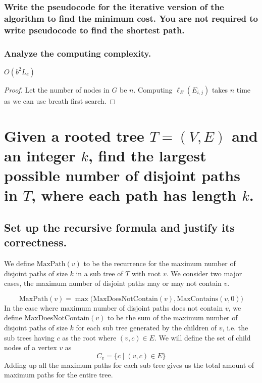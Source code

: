 \documentclass[11pt]{scrartcl}
\newcommand{\maxp}{\text{MaxPath}}
\newcommand{\ctn}{\text{MaxContains}}
\newcommand{\dctn}{\text{MaxDoesNotContain}}
\begin{document}
\subsubsection{
	Write the pseudocode for the iterative version of the algorithm to find the minimum
	cost. You are not required to write pseudocode to find the shortest path.
}
\begin{algorithm}
\end{algorithm}



\subsubsection{
	Analyze the computing complexity.
}
$O(b^2L_e)$
\begin{proof}
	Let the number of nodes in $G$ be $n$.
	Computing $\ell_E(E_{i,j})$ takes $n$ time as we can use breath first search.  
\end{proof}



\section{
  Given a	rooted tree $T = (V, E)$ and an integer $k$, find the largest possible
  number of disjoint paths in $T$, where each path has length $k$.
 }
\subsection{
	Set up the recursive formula and justify its correctness.
}
We define $\maxp(v)$ to be the recurrence for the maximum number of disjoint paths of size $k$ in a sub tree
of $T$ with root $v$. We consider two major cases, the maximum number of disjoint paths may or
may not contain $v$.

$$
	\maxp(v) = \max \Big(\dctn(v), \ctn(v, 0) \Big)
$$
In the case where maximum number of disjoint paths does not contain $v$, we define
$\dctn(v)$ to be the sum of
the maximum number of disjoint paths of size $k$ for each sub tree generated by the children of $v$,
i.e. the sub trees having $c$ as the root where $(v,c) \in E$.
We will define the set of child nodes of a vertex $v$ as $$C_v = \Big\{c \mid (v,c) \in E\Big\}$$
Adding up all the maximum paths for each sub tree
gives us the total amount of maximum paths for the entire tree.
\end{document}
